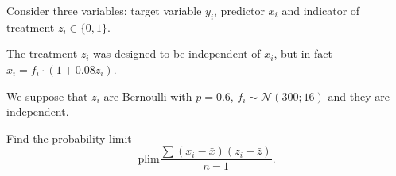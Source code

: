 
\begin{question}
Consider three variables: target variable \(y_i\), predictor \(x_i\) and indicator of treatment \(z_i \in \{0,1\}\).

The treatment \(z_i\) was designed to be independent of \(x_i\), but in fact \(x_i = f_i \cdot (1 + 0.08 z_i)\).

We suppose that \(z_i\) are Bernoulli with \(p=0.6\), \(f_i \sim \mathcal{N}(300;16)\) and they are independent.

Find the probability limit
\[
    \mathrm{plim} \frac{\sum (x_i - \bar x)(z_i - \bar z)}{n-1}.    
\]
\end{question}


